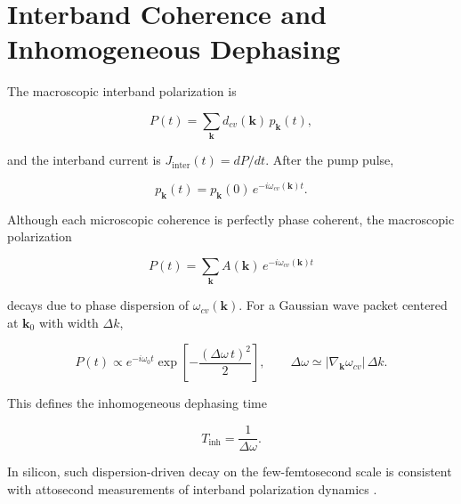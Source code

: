 


\section{Interband Coherence and Inhomogeneous Dephasing}


The macroscopic interband polarization is

\begin{equation}
P(t)=\sum_{\mathbf{k}} d_{cv}(\mathbf{k})\,p_{\mathbf{k}}(t),
\end{equation}

and the interband current is $J_{\mathrm{inter}}(t)=dP/dt$.
After the pump pulse,

\begin{equation}
p_{\mathbf{k}}(t)=p_{\mathbf{k}}(0)\,e^{-i\omega_{cv}(\mathbf{k})t}.
\end{equation}

Although each microscopic coherence is perfectly phase coherent, the macroscopic polarization

\begin{equation}
P(t)=\sum_{\mathbf{k}} A(\mathbf{k})\,e^{-i\omega_{cv}(\mathbf{k})t}
\end{equation}

decays due to phase dispersion of $\omega_{cv}(\mathbf{k})$. For a Gaussian wave packet centered at $\mathbf{k}_0$ with width $\Delta k$,

\begin{equation}
P(t)\propto e^{-i\omega_0 t}\exp\!\left[-\frac{(\Delta\omega\,t)^2}{2}\right],
\qquad
\Delta\omega\simeq |\nabla_{\mathbf{k}}\omega_{cv}|\,\Delta k.
\end{equation}

This defines the inhomogeneous dephasing time

\begin{equation}
T_{\mathrm{inh}}=\frac{1}{\Delta\omega}.
\end{equation}

In silicon, such dispersion-driven decay on the few-femtosecond scale is consistent with attosecond measurements of interband polarization dynamics \cite{Schultze2014Si,Lucchini2016Science}. 


